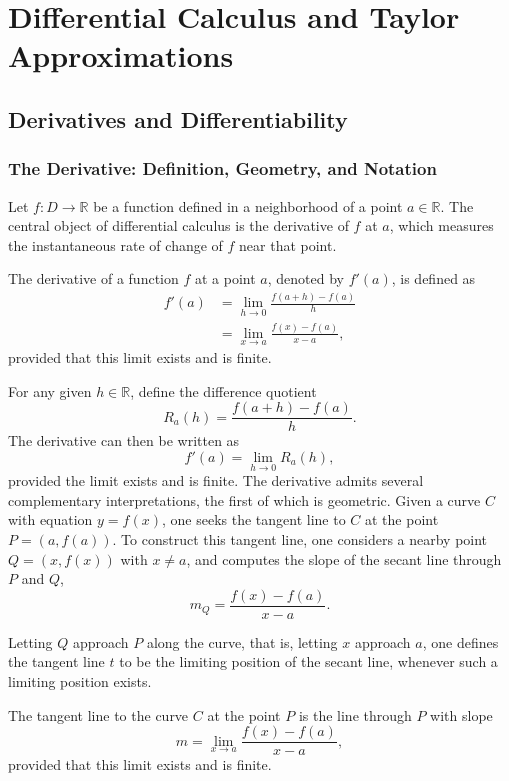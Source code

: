 \chapter{Differential Calculus and Taylor Approximations}

\section{Derivatives and Differentiability}

\subsection{The Derivative: Definition, Geometry, and Notation}

Let $f : D \to \mathbb{R}$ be a function defined in a neighborhood of a point $a \in \mathbb{R}$. The central object of differential calculus is the derivative of $f$ at $a$, which measures the instantaneous rate of change of $f$ near that point.

\begin{definition}
The derivative of a function $f$ at a point $a$, denoted by $f'(a)$, is defined as
\[
\begin{aligned}
f'(a) &= \lim_{h \to 0} \frac{f(a+h) - f(a)}{h} \\
&= \lim_{x \to a} \frac{f(x) - f(a)}{x - a},
\end{aligned}
\]
provided that this limit exists and is finite.
\end{definition}

For any given $h \in \mathbb{R}$, define the difference quotient
\[
R_a(h) = \frac{f(a+h) - f(a)}{h}.
\]
The derivative can then be written as
\[
f'(a) = \lim_{h \to 0} R_a(h),
\] provided the limit exists and is finite. The derivative admits several complementary interpretations, the first of which is geometric. Given a curve $C$ with equation $y = f(x)$, one seeks the tangent line to $C$ at the point $P = (a, f(a))$. To construct this tangent line, one considers a nearby point $Q = (x, f(x))$ with $x \neq a$, and computes the slope of the secant line through $P$ and $Q$,
\[
m_Q = \frac{f(x) - f(a)}{x - a}.
\]

Letting $Q$ approach $P$ along the curve, that is, letting $x$ approach $a$, one defines the tangent line $t$ to be the limiting position of the secant line, whenever such a limiting position exists.

\begin{definition}
The tangent line to the curve $C$ at the point $P$ is the line through $P$ with slope
\[
m = \lim_{x \to a} \frac{f(x) - f(a)}{x - a},
\]
provided that this limit exists and is finite.
\end{definition}

